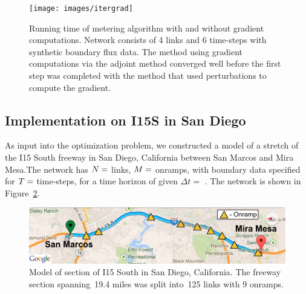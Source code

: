 \begin{figure}
	\begin{centering}
		\texttt{[image: images/itergrad]}
		\par\end{centering}
				
		\caption{Running time of metering algorithm with and without gradient computations.
			Network consists of 4 links and 6 time-steps with synthetic boundary
			flux data. The method using gradient computations via the adjoint
			method converged well before the first step was completed with the
			method that used perturbations to compute the gradient.\label{fig:Running-time-of}}
		\end{figure}
				
				
				
		\subsection{Implementation on I15S in San Diego\label{sub:Network}}
				
		As input into the optimization problem, we constructed a model of
		a  stretch of the I15 South freeway in San Diego,
		California between San Marcos and Mira Mesa.The network has $N=$
		 links, $M=$ onramps,
		with boundary data specified for $T=$  time-steps,
		for a time horizon of  given $\Delta t=$ .
		The network is shown in Figure~\ref{fig:Model-of-section}.
		\begin{figure}
			\begin{centering}
				\includegraphics[width=0.7\columnwidth]{images/map}
				\par\end{centering}
								
				\caption{Model of section of I15 South in San Diego, California. The freeway
					section spanning~19.4 miles was split into~125 links with 9 onramps.\label{fig:Model-of-section}}
				\end{figure}
								
